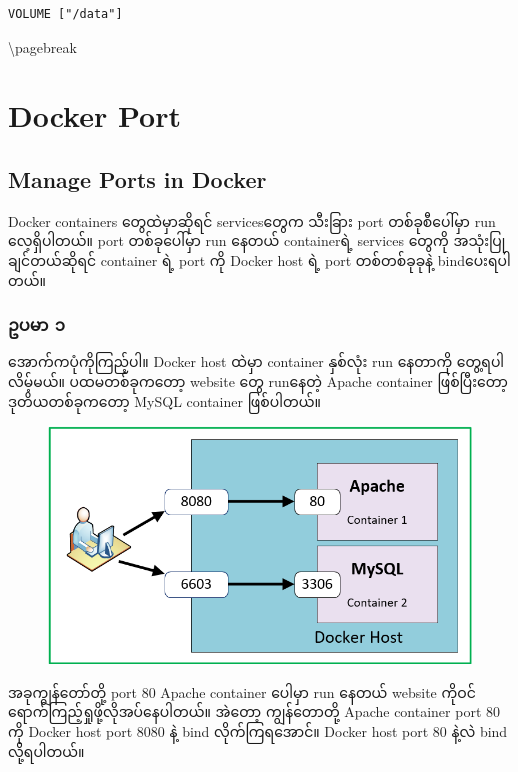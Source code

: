 \begin{verbatim}
VOLUME ["/data"]
\end{verbatim}

\textbackslash{}pagebreak

\section{Docker Port}\label{docker-port}

\subsection{Manage Ports in Docker}\label{manage-ports-in-docker}

Docker containers တွေထဲမှာဆိုရင် servicesတွေက သီးခြား port
တစ်ခုစီပေါ်မှာ run လေ့ရှိပါတယ်။ port တစ်ခုပေါ်မှာ run နေတယ် containerရဲ့
services ‌တွေကို အသုံးပြုချင်တယ်ဆိုရင် container ရဲ့ port ကို Docker
host ရဲ့ port တစ်တစ်ခုခုနဲ့ bindပေးရပါတယ်။

\subsubsection{ဥပမာ ၁}\label{ux1025ux1015ux1019}

အောက်‌ကပုံကိုကြည့်ပါ။ Docker host ထဲမှာ container နှစ်လုံး run နေတာကို
တွေ့ရပါလိမ့်မယ်။ ပထမတစ်ခုကတော့ website တွေ runနေတဲ့ Apache container
ဖြစ်ပြီးတော့ ဒုတိယတစ်ခုကတော့ MySQL container ဖြစ်ပါတယ်။

\begin{figure}[htbp]
\centering
\includegraphics{.gitbook/assets/screenshot-132.png}
\end{figure}

အခုကျွန်တော်တို့ port 80 Apache container ပေါမှာ run နေတယ် website
ကိုဝင်ရောက်ကြည့်ရှုဖို့လိုအပ်နေပါတယ်။ အဲတော့ ကျွန်တောတို့ Apache
container port 80 ကို Docker host port 8080 နဲ့ bind လိုက်ကြရအောင်။
Docker host port 80 နဲ့လဲ bind လို့ရပါတယ်။

